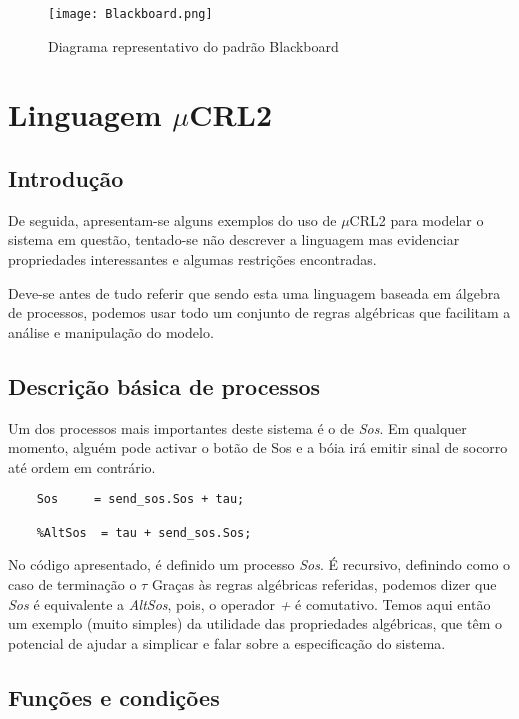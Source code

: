 \documentclass[a4paper,11pt]{article}
\newcommand{\mc}{$\mu$CRL2}
\begin{document}
\begin{figure}[htb]
\texttt{[image: Blackboard.png]}
\centering
\caption{Diagrama representativo do padrão Blackboard}
\end{figure}

\pagebreak

\section{ Linguagem \mc}

\subsection{Introdução}

De seguida, apresentam-se alguns exemplos do uso de \mc{} para modelar o 
sistema em questão, tentado-se não descrever a linguagem mas evidenciar propriedades 
interessantes e algumas restrições encontradas.
\par Deve-se antes de tudo referir que sendo esta uma linguagem baseada 
em álgebra de processos, podemos usar todo um conjunto de regras algébricas 
que facilitam a análise e manipulação do modelo. \par

\subsection {Descrição básica de processos}
Um dos processos mais importantes deste sistema é o de \emph{Sos}. Em qualquer momento, 
alguém pode activar o botão de Sos e a bóia irá emitir sinal de socorro até ordem 
em contrário.

\begin{lstlisting}
	Sos 	= send_sos.Sos + tau;
	
	%AltSos  = tau + send_sos.Sos;	
\end{lstlisting}

No código apresentado, é definido um processo \emph{Sos}. 
É recursivo, definindo como o caso de terminação o $\tau$ 
Graças às regras algébricas referidas, podemos 
dizer que \emph{Sos} é equivalente a \emph{AltSos}, pois, o operador \emph{+} é
comutativo. Temos aqui então um exemplo (muito simples) da utilidade 
das propriedades algébricas, que têm o 
potencial de ajudar a simplicar e falar sobre a especificação do sistema.


\subsection{ Funções e condições }
\end{document}
